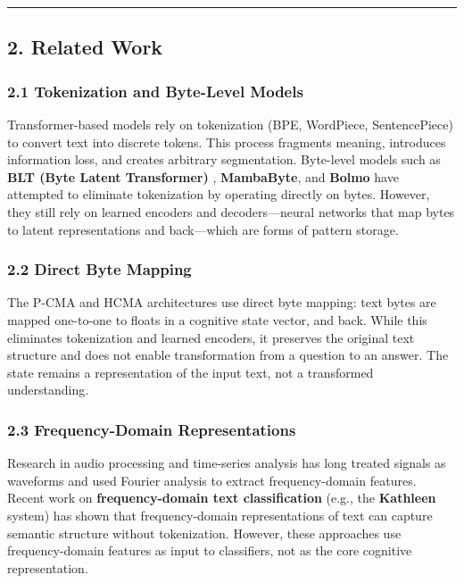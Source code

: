 \documentclass[
  11pt,
  a4paper,
]{article}
\begin{document}
\begin{center}\rule{0.5\linewidth}{0.5pt}\end{center}

\subsection{2. Related Work}\label{related-work}

\subsubsection{2.1 Tokenization and Byte-Level
Models}\label{tokenization-and-byte-level-models}

Transformer-based models rely on tokenization (BPE, WordPiece,
SentencePiece) to convert text into discrete tokens. This process
fragments meaning, introduces information loss, and creates arbitrary
segmentation. Byte-level models such as \textbf{BLT (Byte Latent
Transformer)} , \textbf{MambaByte}, and \textbf{Bolmo} have attempted to
eliminate tokenization by operating directly on bytes. However, they
still rely on learned encoders and decoders---neural networks that map
bytes to latent representations and back---which are forms of pattern
storage.

\subsubsection{2.2 Direct Byte Mapping}\label{direct-byte-mapping}

The P-CMA and HCMA architectures use direct byte mapping: text bytes are
mapped one-to-one to floats in a cognitive state vector, and back. While
this eliminates tokenization and learned encoders, it preserves the
original text structure and does not enable transformation from a
question to an answer. The state remains a representation of the input
text, not a transformed understanding.

\subsubsection{2.3 Frequency-Domain
Representations}\label{frequency-domain-representations}

Research in audio processing and time-series analysis has long treated
signals as waveforms and used Fourier analysis to extract
frequency-domain features. Recent work on \textbf{frequency-domain text
classification} (e.g., the \textbf{Kathleen} system) has shown that
frequency-domain representations of text can capture semantic structure
without tokenization. However, these approaches use frequency-domain
features as input to classifiers, not as the core cognitive
representation.
\end{document}
